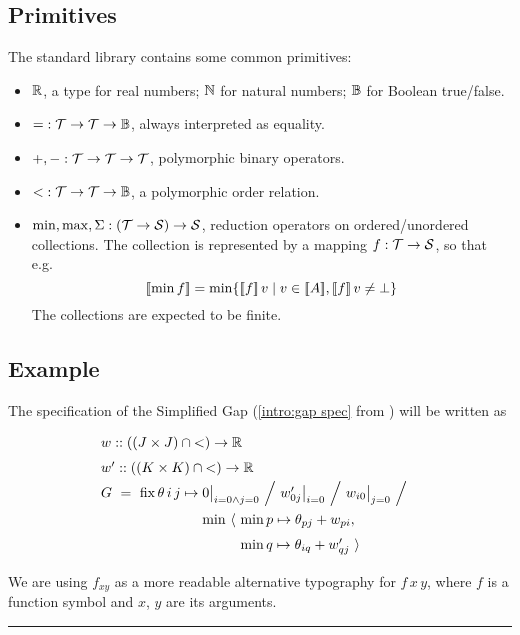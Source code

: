 \subsection{Primitives}

The standard library contains some common primitives:

\begin{itemize}
  \item $\mathbb{R}$, a type for real numbers; $\mathbb{N}$ for natural numbers; $\mathbb{B}$ for Boolean true/false.
  \item ${=} : \mathcal{T}\to\mathcal{T}\to\mathbb{B}$, always interpreted as equality.
  \item ${+}, {-} : \mathcal{T}\to\mathcal{T}\to\mathcal{T}$, polymorphic binary operators.
  \item ${<} : \mathcal{T}\to\mathcal{T}\to\mathbb{B}$, a polymorphic order relation.
  \item $\min, \max, \Sigma : (\mathcal{T}\to\mathcal{S})\to\mathcal{S}$, reduction operators
    on ordered/unordered collections. The collection is represented by a mapping $f : \mathcal{T}\to\mathcal{S}$,
    so that e.g. \[\semp{\min f} = \min \{\semp{f}\,v \;|\; v\in\semp{A}, \semp{f}\,v\neq\bot\}\]
    The collections are expected to be finite.
\end{itemize}

\subsection{Example \hrulefill}

The specification of the Simplified Gap (\eqref{intro:gap spec} from ) will be written as
%
\begin{equation}
  \renewcommand\arraystretch{1.5}
  \begin{array}{@{}l@{}l@{}l@{}}
    \lspan3{w :: ((J\times J)\cap{<})\to\R} \\
    \lspan3{w' :: ((K\times K)\cap{<})\to\R} \\
    G ~=~ \fix \theta\,i\,j\mapsto{}
      & \lspan2{0\big|_{i=0\land j=0} ~\Big/~ w'_{0j}\big|_{i=0} ~\Big/~ w_{i0}\big|_{j=0} ~\Big/~} \\
      & \min~\langle~ & \min p\mapsto\theta_{pj}+w_{pi}, \\
      & & \min q\mapsto\theta_{iq}+w'_{qj} ~\rangle
  \end{array}
  \label{lang:gap spec}
\end{equation}

\medskip
We are using $f_{xy}$
as a more readable alternative typography for $f\,x\,y$,
where $f$ is a function symbol and $x$, $y$ are its arguments.

\medskip
\hrule
